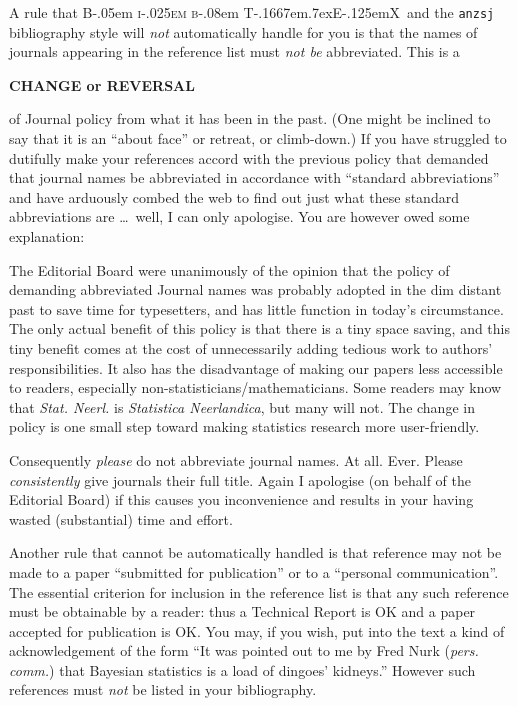 \documentclass[times, doublespace]{anzsauth}
\newcommand\BibTeX{{\rmfamily B\kern-.05em \textsc{i\kern-.025em b}\kern-.08em
T\kern-.1667em\lower.7ex\hbox{E}\kern-.125emX}}
\begin{document}
A rule that \BibTeX\ and the \texttt{anzsj} bibliography style will
\emph{not} automatically handle for you is that the names of journals
appearing in the reference list must \emph{not be} abbreviated.
This is a
\begin{center}
{\large \textbf{CHANGE or REVERSAL}}
\end{center}
of Journal policy from what it has been in the past. (One might
be inclined to say that it is an ``about face'' or retreat, or
climb-down.)  If you have struggled to dutifully make your references
accord with the previous policy that demanded that journal names
be abbreviated in accordance with ``standard abbreviations'' and
have arduously combed the web to find out just what these standard
abbreviations are \ldots\ well, I can only apologise.  You are however
owed some explanation:

The Editorial Board were unanimously of the opinion that
the policy of demanding abbreviated Journal names was probably
adopted in the dim distant past to save time for typesetters,
and has little function in today's circumstance.  The only actual
benefit of this policy is that there is a tiny space saving,
and this tiny benefit comes at the cost of unnecessarily adding
tedious work to authors' responsibilities.  It also has the
disadvantage of making our papers less accessible to readers,
especially non-statisticians/mathematicians. Some readers may know
that \textit{Stat. Neerl.} is \textit{Statistica Neerlandica},
but many will not.  The change in policy is one small step toward
making statistics research more user-friendly.

Consequently \emph{please} do not abbreviate journal names.  At all.
Ever.  Please \emph{consistently} give journals their full title.
Again I apologise (on behalf of the Editorial Board) if this causes
you inconvenience and results in your having wasted (substantial)
time and effort.

Another rule that cannot be automatically handled is that reference
may not be made to a paper ``submitted for publication'' or to a
``personal communication''. The essential criterion for inclusion
in the reference list is that any such reference must be obtainable
by a reader: thus a Technical Report is OK and a paper accepted for
publication is OK.  You may, if you wish, put into the text a kind
of acknowledgement of the form ``It was pointed out to me by Fred
Nurk (\textit{pers. comm.}) that Bayesian statistics is a load
of dingoes' kidneys.''  However such references must \emph{not}
be listed in your bibliography.
\end{document}
